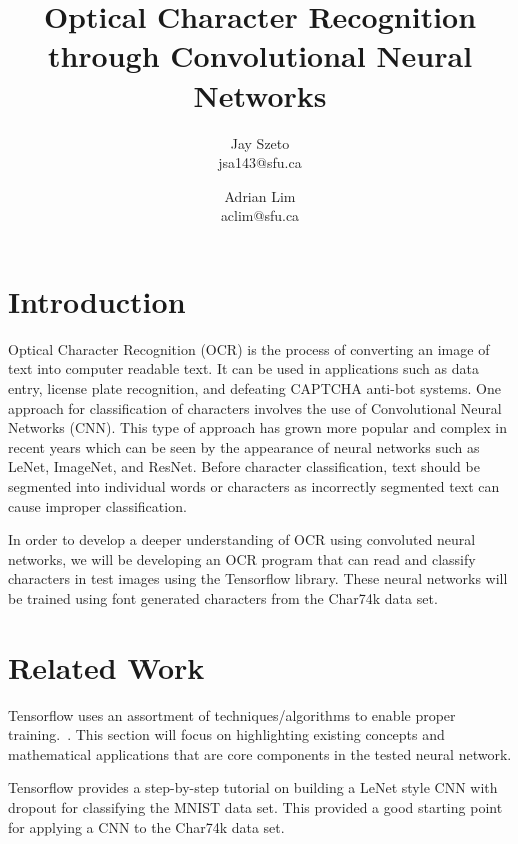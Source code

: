 \documentclass[11pt]{article}
\begin{document}
\title{\vspace{-2.5cm}Optical Character Recognition through Convolutional Neural Networks}
\author{Jay Szeto\\ jsa143@sfu.ca \and Adrian Lim\\ aclim@sfu.ca}
\maketitle

\hrulefill

\section{Introduction}
    Optical Character Recognition (OCR) is the process of converting an image of text into computer readable text.\cite{ocr_wiki_2017} It can be used in applications such as data entry, license plate recognition, and defeating CAPTCHA anti-bot systems.\cite{ocr_wiki_2017} One approach for classification of characters involves the use of Convolutional Neural Networks (CNN).\cite{lecun_bottou_bengio_haffner_1998} This type of approach has grown more popular and complex in recent years which can be seen by the appearance of neural networks such as LeNet, ImageNet, and ResNet. \cite{lecun_bottou_bengio_haffner_1998, image_net_2012, he2016deep} Before character classification, text should be segmented into individual words or characters as incorrectly segmented text can cause improper classification. \cite{shinde_textpre-processing}
    
    In order to develop a deeper understanding of OCR using convoluted neural networks, we will be developing an OCR program that can read and classify characters in test images using the Tensorflow library. \cite{tensorflow15-whitepaper} These neural networks will be trained using font generated characters from the Char74k data set. \cite{deCampos09}
    
\section{Related Work}
    Tensorflow uses an assortment of techniques/algorithms to enable proper training.~\cite{mnist-for-ml-beginners17}. This section will focus on highlighting existing concepts and mathematical applications that are core components in the tested neural network.
    
    Tensorflow provides a step-by-step tutorial on building a LeNet style CNN with dropout for classifying the MNIST data set.\cite{tensorflow15-whitepaper, lecun_bottou_bengio_haffner_1998} This provided a good starting point for applying a CNN to the Char74k data set.
\end{document}
